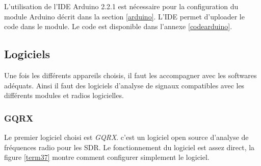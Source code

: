 \vspace{0.1cm}

L'utilisation de l'IDE Arduino 2.2.1 est nécessaire pour la configuration du module Arduino décrit dans la section \ref{arduino}. L'IDE permet d'uploader le code  dans le module. Le code est disponible dans l'annexe \ref{codearduino}.

\subsection{Logiciels}\label{fft}

Une fois les différents appareils choisis, il faut les accompagner avec les softwares adéquats. Ainsi il faut des logiciels d'analyse de signaux compatibles avec les différents modules et radios logicielles.

\subsubsection{GQRX}

Le premier logiciel choisi est \textit{GQRX}. c'est un logiciel open source d'analyse de fréquences radio pour les SDR. Le fonctionnement du logiciel est assez direct, la figure \ref{term37} montre comment configurer simplement le logiciel.

